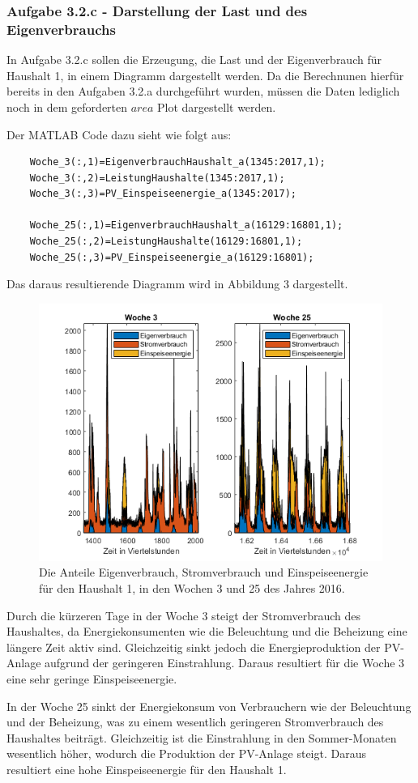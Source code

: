 \documentclass[a4paper,12pt]{article}
\begin{document}
	\subsubsection{Aufgabe 3.2.c - Darstellung der Last und des Eigenverbrauchs}
	In Aufgabe 3.2.c sollen die Erzeugung, die Last und der Eigenverbrauch für Haushalt 1, in einem Diagramm dargestellt werden.\newline
	Da die Berechnunen hierfür bereits in den Aufgaben 3.2.a durchgeführt wurden, müssen die Daten lediglich noch in dem geforderten $area$ Plot dargestellt werden.\\ \par
	\noindent Der MATLAB Code dazu sieht wie folgt aus:
	\begin{lstlisting}
	Woche_3(:,1)=EigenverbrauchHaushalt_a(1345:2017,1);
	Woche_3(:,2)=LeistungHaushalte(1345:2017,1);
	Woche_3(:,3)=PV_Einspeiseenergie_a(1345:2017);
	
	Woche_25(:,1)=EigenverbrauchHaushalt_a(16129:16801,1);
	Woche_25(:,2)=LeistungHaushalte(16129:16801,1);
	Woche_25(:,3)=PV_Einspeiseenergie_a(16129:16801);
	\end{lstlisting}
	Das daraus resultierende Diagramm wird in Abbildung 3 dargestellt.
	\begin{figure}[H]
		\centering
		\includegraphics[width=12cm]{img/results/LastundEigenverbrauch}
		\caption{Die Anteile Eigenverbrauch, Stromverbrauch und Einspeiseenergie für den Haushalt 1, in den Wochen 3 und 25 des Jahres 2016.}
	\end{figure}
	\noindent Durch die kürzeren Tage in der Woche 3 steigt der Stromverbrauch des Haushaltes, da Energiekonsumenten wie die Beleuchtung und die Beheizung eine längere Zeit aktiv sind. Gleichzeitig sinkt jedoch die Energieproduktion der PV-Anlage aufgrund der geringeren Einstrahlung. Daraus resultiert für die Woche 3 eine sehr geringe Einspeiseenergie.\\ \par
	\noindent In der Woche 25 sinkt der Energiekonsum von Verbrauchern wie der Beleuchtung und der Beheizung, was zu einem wesentlich geringeren Stromverbrauch des Haushaltes beiträgt. Gleichzeitig ist die Einstrahlung in den Sommer-Monaten wesentlich höher, wodurch die Produktion der PV-Anlage steigt. Daraus resultiert eine hohe Einspeiseenergie für den Haushalt 1.
\end{document}

